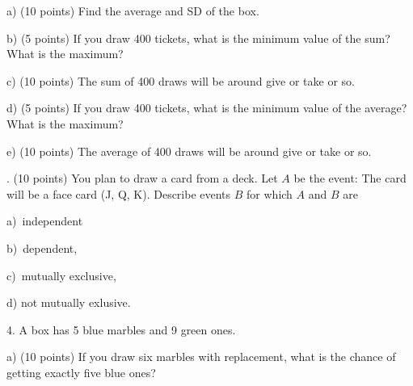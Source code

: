 \documentclass[10pt]{article}
\begin{document}
\hspace{10pt} a) (10 points) Find the average and SD of the box.
\vspace{2in}

\hspace{10pt} b) (5 points)
If you draw 400 tickets, what is the minimum value of the sum?  What is the maximum?
\vspace{1.3in}

\hspace{10pt} c) (10 points) The sum of 400 draws will be around \underline{\hspace{1in}} give or take
\underline{\hspace{1in}} or so.
\vspace{1.3in}

\hspace{10pt} d) (5 points)
If you draw 400 tickets, what is the minimum value of the average?  What is the maximum?
\vspace{1.3in}

\hspace{10pt} e) (10 points) The average of 400 draws will be around \underline{\hspace{1in}} give or take
\underline{\hspace{1in}} or so.
\vspace{1.3in}


\vfill
{}. (10 points) You plan to draw a card from a deck.
Let $A$ be the event: The card will be a face card (J, Q, K).
Describe events $B$ for which
$A$ and $B$ are

\hspace{10pt} a)~independent
\vspace{.3in}

\hspace{10pt} b)~dependent,
\vspace{.3in}

\hspace{10pt} c)~mutually exclusive, 
\vspace{.3in}

\hspace{10pt} d) not mutually exlusive.
\vspace{.3in}

4.  A box has 5 blue marbles and 9 green ones.  

\hspace{20pt} a) (10 points) If you draw six marbles with replacement, what is the chance of getting 
exactly five blue ones?
\vspace{1.9in}
\end{document}
